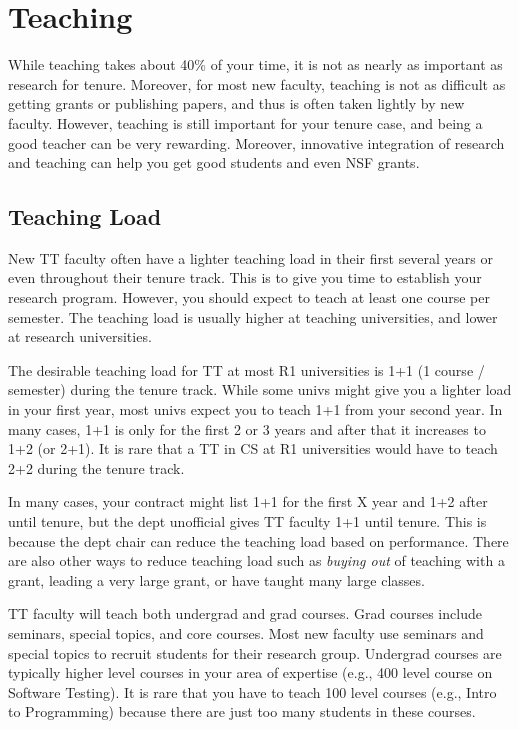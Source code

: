 \documentclass[oneside,11pt,dvipsnames]{book}
\begin{document}
\chapter{Teaching}\label{chapter:teaching}

While teaching takes about 40\% of your time, it is not as nearly as important as research for tenure.  Moreover, for most new faculty, teaching is not as difficult as getting grants or publishing papers, and thus is often taken lightly by new faculty.  However, teaching is still important for your tenure case, and being a good teacher can be very rewarding. Moreover, innovative integration of research and teaching can help you get good students and even NSF grants.

\section{Teaching Load}
New TT faculty often have a lighter teaching load in their first several years or even throughout their tenure track.  This is to give you time to establish your research program.  However, you should expect to teach at least one course per semester. The teaching load is usually higher at teaching universities, and lower at research universities.

The desirable teaching load for TT at most R1 universities is 1+1 (1 course / semester) during the tenure track. While some univs might give you a lighter load in your first year, most univs expect you to teach 1+1 from your second year. In many cases, 1+1 is only for the first 2 or 3 years and after that it increases to 1+2 (or 2+1). It is rare that a TT in CS at R1 universities would have to teach 2+2 during the tenure track.

In many cases, your contract might list 1+1 for the first X year and 1+2 after until tenure, but the dept unofficial gives TT faculty 1+1 until tenure. This is because the dept chair can reduce the teaching load based on performance. There are also other ways to reduce teaching load such as \emph{buying out} of teaching with a grant, leading a very large grant, or have taught many large classes.

TT faculty will teach both undergrad and grad courses.  Grad courses include seminars, special topics, and core courses.  Most new faculty use seminars and special topics to recruit students for their research group.  Undergrad courses are typically higher level courses in your area of expertise (e.g., 400 level course on Software Testing).  It is rare that you have to teach 100 level courses (e.g., Intro to Programming) because there are just too many students in these courses.
\end{document}
